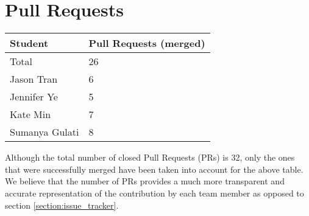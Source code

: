 \documentclass{article}
\begin{document}
\section{Pull Requests}

\begin{table}[H]
	\centering
	\begin{tabular}{ll}
	\toprule
	\textbf{Student} & \textbf{Pull Requests (merged)} \\
	\midrule
	Total & 26 \\
	Jason Tran & 6 \\
	Jennifer Ye & 5 \\
	Kate Min & 7 \\
	Sumanya Gulati & 8 \\
	\bottomrule
	\end{tabular}
\end{table}

Although the total number of closed Pull Requests (PRs) is 32, only the 
ones that were successfully merged have been taken into account for the
above table. We believe that the number of PRs provides a much more
transparent and accurate representation of the contribution by each team
member as opposed to section \ref{section:issue_tracker}. 
\end{document}
